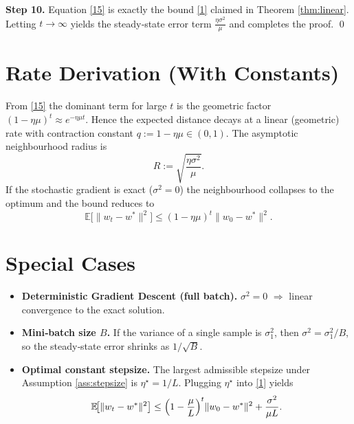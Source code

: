 \documentclass[11pt]{article}
\newcommand{\E}{\mathbb{E}}
\begin{document}
\noindent\textbf{Step 10.} Equation \eqref{15} is exactly the bound \eqref{1} claimed in Theorem \ref{thm:linear}. Letting $t\to\infty$ yields the steady‑state error term $\frac{\eta\sigma^{2}}{\mu}$ and completes the proof. \qed

\section*{Rate Derivation (With Constants)}
From \eqref{15} the dominant term for large $t$ is the geometric factor $(1-\eta\mu)^{t}\approx e^{-\eta\mu t}$. Hence the expected distance decays at a linear (geometric) rate with contraction constant $q:=1-\eta\mu\in(0,1)$. The asymptotic neighbourhood radius is
\[
R:=\sqrt{\frac{\eta\sigma^{2}}{\mu}}.
\]
If the stochastic gradient is exact ($\sigma^{2}=0$) the neighbourhood collapses to the optimum and the bound reduces to
\[
\E\!\big[\|w_{t}-w^{*}\|^{2}\big]\le (1-\eta\mu)^{t}\|w_{0}-w^{*}\|^{2}.
\]

\section*{Special Cases}
\begin{itemize}
\item \textbf{Deterministic Gradient Descent (full batch).} $\sigma^{2}=0$ $\Rightarrow$ linear convergence to the exact solution.
\item \textbf{Mini‑batch size $B$.} If the variance of a single sample is $\sigma_{1}^{2}$, then $\sigma^{2}=\sigma_{1}^{2}/B$, so the steady‑state error shrinks as $1/\sqrt{B}$.
\item \textbf{Optimal constant stepsize.} The largest admissible stepsize under Assumption \ref{ass:stepsize} is $\eta^{\star}=1/L$. Plugging $\eta^{\star}$ into \eqref{1} yields
\[
\E\!\big[\|w_{t}-w^{*}\|^{2}\big]\le
\Bigl(1-\frac{\mu}{L}\Bigr)^{t}\|w_{0}-w^{*}\|^{2}
+ \frac{\sigma^{2}}{\mu L}.
\]
\end{itemize}
\end{document}
